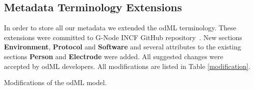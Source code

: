 \documentclass[conference]{IEEEtran}
\begin{document}
 \subsection{Metadata Terminology Extensions}
 \label{meta_adjustments}
 In order to store all our metadata we extended the odML terminology. These extensions were committed to G-Node INCF GitHub repository~\cite{odmlgithub}. New sections \textbf{Environment}, \textbf{Protocol} and \textbf{Software} and several attributes to the existing sections \textbf{Person} and \textbf{Electrode} were added. All suggested changes were accepted by odML developers. All modifications are listed in Table \ref{modification}.
 	\begin{savenotes}
 \begin{table}

 \caption{Modifications of the odML model.}
 	\label{modification}


\end{table}
\end{savenotes}
\end{document}
